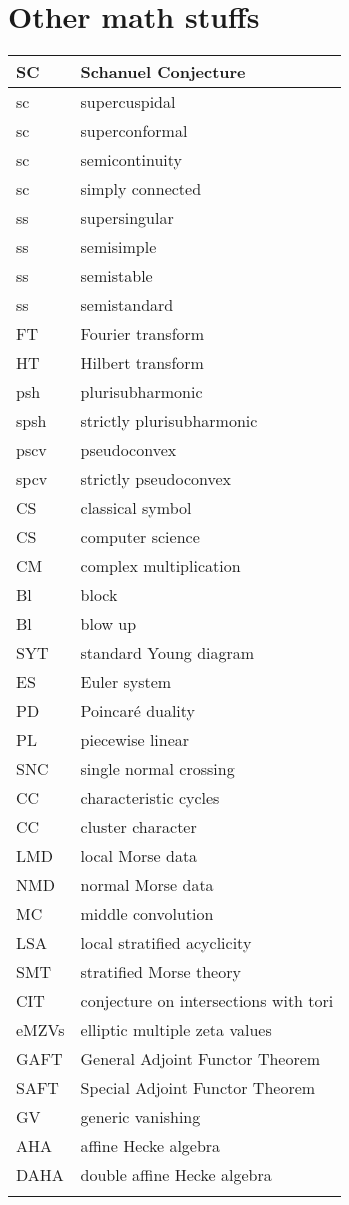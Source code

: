 \documentclass{amsart}
\numberwithin{equation}{section}
\theoremstyle{plain}
\numberwithin{equation}{section}
\theoremstyle{remark}
\begin{document}
\section{Other math stuffs}
\begin{longtable}{l|l}
\hline
SC & Schanuel Conjecture \\ \hline
sc & supercuspidal\\ \hline
sc & superconformal\\ \hline
sc & semicontinuity\\ \hline
sc & simply connected\\ \hline
ss & supersingular\\ \hline
ss & semisimple\\ \hline
ss & semistable\\ \hline
ss & semistandard\\ \hline
FT & Fourier transform\\ \hline
HT & Hilbert transform\\ \hline
psh & plurisubharmonic\\ \hline
spsh & strictly plurisubharmonic\\ \hline
pscv & pseudoconvex\\ \hline
spcv & strictly pseudoconvex\\ \hline 
CS & classical symbol\\ \hline
CS & computer science\\ \hline
CM & complex multiplication\\ \hline
Bl  & block\\ \hline
Bl  & blow up\\ \hline
SYT  & standard Young diagram\\ \hline
ES  & Euler system\\ \hline
PD & Poincaré duality\\ \hline
PL & piecewise linear\\ \hline
SNC & single normal crossing\\ \hline
CC & characteristic cycles\\ \hline
CC & cluster character\\ \hline
LMD & local Morse data\\ \hline
NMD & normal Morse data\\ \hline
MC & middle convolution\\ \hline
LSA & local stratified acyclicity\\ \hline
SMT & stratified Morse theory\\ \hline
CIT & conjecture on intersections with tori\\ \hline
eMZVs & elliptic multiple zeta values\\ \hline
GAFT & General Adjoint Functor Theorem\\ \hline
SAFT & Special Adjoint Functor Theorem\\ \hline
GV & generic vanishing\\ \hline
AHA & affine Hecke algebra\\ \hline
DAHA & double affine Hecke algebra\\ \hline
 & \\ \hline
\end{longtable}
\end{document}
